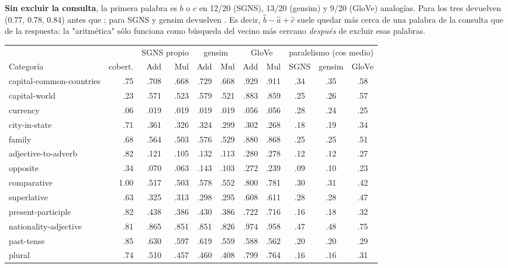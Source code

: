 \documentclass[10pt,letterpaper]{article}
\begin{document}
\textbf{Sin excluir la consulta}, la primera palabra es $b$ o $c$ en 12/20 (SGNS), 13/20 (gensim) y 9/20 (GloVe) analogías.
Para  los tres devuelven  (0.77, 0.78, 0.84) antes que ; para
 SGNS y gensim devuelven . Es decir, $\hat b-\hat a+\hat c$ suele quedar más cerca de
una palabra de la consulta que de la respuesta: la "aritmética" sólo funciona como búsqueda del vecino más cercano
\emph{después} de excluir esas palabras.

\begin{table}[H]
\centering\footnotesize
\begin{tabular}{@{}lr|rr|rr|rr|ccc@{}}
\toprule
& & \multicolumn{2}{c|}{SGNS propio} & \multicolumn{2}{c|}{gensim} & \multicolumn{2}{c|}{GloVe} & \multicolumn{3}{c}{paralelismo (cos medio)} \\
Categoría & cobert. & Add & Mul & Add & Mul & Add & Mul & SGNS & gensim & GloVe \\
\midrule
capital-common-countries & .75 & .708 & .668 & .729 & .668 & .929 & .911 & .34 & .35 & .58 \\
capital-world & .23 & .571 & .523 & .579 & .521 & .883 & .859 & .25 & .26 & .57 \\
currency & .06 & .019 & .019 & .019 & .019 & .056 & .056 & .28 & .24 & .25 \\
city-in-state & .71 & .361 & .326 & .324 & .299 & .302 & .268 & .18 & .19 & .34 \\
family & .68 & .564 & .503 & .576 & .529 & .880 & .868 & .25 & .25 & .51 \\
adjective-to-adverb & .82 & .121 & .105 & .132 & .113 & .280 & .278 & .12 & .12 & .27 \\
opposite & .34 & .070 & .063 & .143 & .103 & .272 & .239 & .09 & .10 & .23 \\
comparative & 1.00 & .517 & .503 & .578 & .552 & .800 & .781 & .30 & .31 & .42 \\
superlative & .63 & .325 & .313 & .298 & .295 & .608 & .611 & .28 & .28 & .47 \\
present-participle & .82 & .438 & .386 & .430 & .386 & .722 & .716 & .16 & .18 & .32 \\
nationality-adjective & .81 & .865 & .851 & .851 & .826 & .974 & .958 & .47 & .48 & .75 \\
past-tense & .85 & .630 & .597 & .619 & .559 & .588 & .562 & .20 & .20 & .29 \\
plural & .74 & .510 & .457 & .460 & .408 & .799 & .764 & .16 & .16 & .31 \\

\end{tabular}
\end{table}
\end{document}
